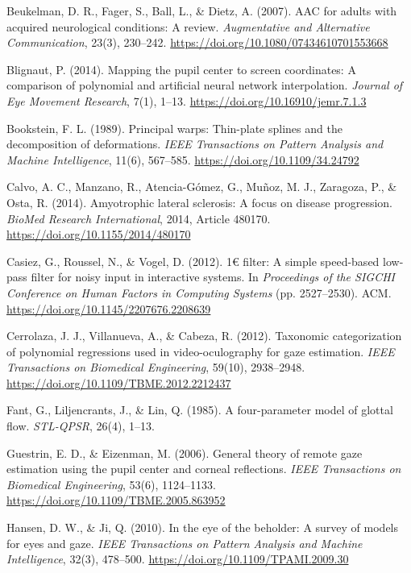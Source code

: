 \documentclass[twocolumn,10pt]{article}
\begin{document}
\begin{description}
    \item Beukelman, D. R., Fager, S., Ball, L., \& Dietz, A. (2007). AAC for adults with acquired neurological conditions: A review. \textit{Augmentative and Alternative Communication}, 23(3), 230--242. \url{https://doi.org/10.1080/07434610701553668}
    \item Blignaut, P. (2014). Mapping the pupil center to screen coordinates: A comparison of polynomial and artificial neural network interpolation. \textit{Journal of Eye Movement Research}, 7(1), 1--13. \url{https://doi.org/10.16910/jemr.7.1.3}
    \item Bookstein, F. L. (1989). Principal warps: Thin-plate splines and the decomposition of deformations. \textit{IEEE Transactions on Pattern Analysis and Machine Intelligence}, 11(6), 567--585. \url{https://doi.org/10.1109/34.24792}
    \item Calvo, A. C., Manzano, R., Atencia-G{\'o}mez, G., Mu{\~n}oz, M. J., Zaragoza, P., \& Osta, R. (2014). Amyotrophic lateral sclerosis: A focus on disease progression. \textit{BioMed Research International}, 2014, Article 480170. \url{https://doi.org/10.1155/2014/480170}
    \item Casiez, G., Roussel, N., \& Vogel, D. (2012). 1€ filter: A simple speed-based low-pass filter for noisy input in interactive systems. In \textit{Proceedings of the SIGCHI Conference on Human Factors in Computing Systems} (pp. 2527--2530). ACM. \url{https://doi.org/10.1145/2207676.2208639}
    \item Cerrolaza, J. J., Villanueva, A., \& Cabeza, R. (2012). Taxonomic categorization of polynomial regressions used in video-oculography for gaze estimation. \textit{IEEE Transactions on Biomedical Engineering}, 59(10), 2938--2948. \url{https://doi.org/10.1109/TBME.2012.2212437}
    \item Fant, G., Liljencrants, J., \& Lin, Q. (1985). A four-parameter model of glottal flow. \textit{STL-QPSR}, 26(4), 1--13.
    \item Guestrin, E. D., \& Eizenman, M. (2006). General theory of remote gaze estimation using the pupil center and corneal reflections. \textit{IEEE Transactions on Biomedical Engineering}, 53(6), 1124--1133. \url{https://doi.org/10.1109/TBME.2005.863952}
    \item Hansen, D. W., \& Ji, Q. (2010). In the eye of the beholder: A survey of models for eyes and gaze. \textit{IEEE Transactions on Pattern Analysis and Machine Intelligence}, 32(3), 478--500. \url{https://doi.org/10.1109/TPAMI.2009.30}

\end{description}
\end{document}
